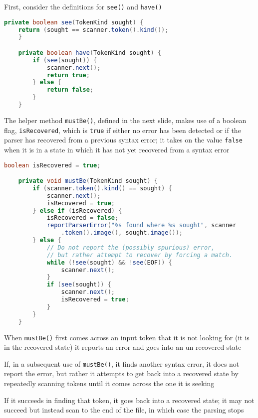 \documentclass[8pt,a4paper,compress]{beamer}
\begin{document}
\begin{frame}[fragile]
\pause

First, consider the definitions for \lstinline{see()} and \lstinline{have()}

\begin{lstlisting}[language=Java]
    private boolean see(TokenKind sought) {
	return (sought == scanner.token().kind());
    }

    private boolean have(TokenKind sought) {
        if (see(sought)) {
            scanner.next();
            return true;
        } else {
            return false;
        }
    }
\end{lstlisting}

\pause
\bigskip

The helper method \lstinline{mustBe()}, defined in the next slide, makes use of a boolean flag, \lstinline{isRecovered}, which is \lstinline{true} if either no error has been detected or if the parser has recovered from a previous syntax error; it takes on the value \lstinline{false} when it is in a state in which it has not yet recovered from a syntax error
\end{frame}

\begin{frame}[fragile]
\pause

\begin{lstlisting}[language=Java]
    boolean isRecovered = true;

    private void mustBe(TokenKind sought) {
        if (scanner.token().kind() == sought) {
            scanner.next();
            isRecovered = true;
        } else if (isRecovered) {
            isRecovered = false;
            reportParserError("%s found where %s sought", scanner                                                                                                                                                                             
                .token().image(), sought.image());
        } else {
            // Do not report the (possibly spurious) error,
            // but rather attempt to recover by forcing a match.
            while (!see(sought) && !see(EOF)) {
                scanner.next();
            }
            if (see(sought)) {
                scanner.next();
                isRecovered = true;
            }
        }
    }
\end{lstlisting}

\pause
\bigskip

When \lstinline{mustBe()} first comes across an input token that it is not looking for (it is in the recovered state) it reports an error and goes into an un-recovered state

\pause
\bigskip

If, in a subsequent use of \lstinline{mustBe()}, it finds another syntax error, it does not report the error, but rather it attempts to get back into a recovered state by repeatedly scanning tokens until it comes across the one it is seeking

\pause
\bigskip

If it succeeds in finding that token, it goes back into a recovered state; it may not succeed but instead scan to the end of the file, in which case the parsing stops
\end{frame}
\end{document}
